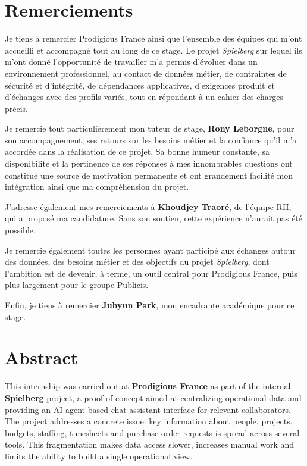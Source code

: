 \documentclass[a4paper,11pt,english,openany]{book}
\begin{document}
\newpage
{}

\chapter*{Remerciements}


Je tiens à remercier Prodigious France ainsi que l'ensemble des équipes qui m'ont accueilli et accompagné tout au long de ce stage. Le projet \textit{Spielberg} sur lequel ils m'ont donné l'opportunité de travailler m'a permis d'évoluer dans un environnement professionnel, au contact de données métier, de contraintes de sécurité et d'intégrité, de dépendances applicatives, d'exigences produit et d'échanges avec des profils variés, tout en répondant à un cahier des charges précis.

Je remercie tout particulièrement mon tuteur de stage, \textbf{Rony Leborgne}, pour son accompagnement, ses retours sur les besoins métier et la confiance qu'il m'a accordée dans la réalisation de ce projet. Sa bonne humeur constante, sa disponibilité et la pertinence de ses réponses à mes innombrables questions ont constitué une source de motivation permanente et ont grandement facilité mon intégration ainsi que ma compréhension du projet.

J'adresse également mes remerciements à \textbf{Khoudjey Traoré}, de l'équipe RH, qui a proposé ma candidature. Sans son soutien, cette expérience n'aurait pas été possible.

Je remercie également toutes les personnes ayant participé aux échanges autour des données, des besoins métier et des objectifs du projet \textit{Spielberg}, dont l'ambition est de devenir, à terme, un outil central pour Prodigious France, puis plus largement pour le groupe Publicis.

Enfin, je tiens à remercier \textbf{Juhyun Park}, mon encadrante académique pour ce stage.

\chapter*{Abstract}

This internship was carried out at \textbf{Prodigious France} as part of the internal \textbf{Spielberg} project, a proof of concept aimed at centralizing operational data and providing an AI-agent-based chat assistant interface for relevant collaborators. The project addresses a concrete issue: key information about people, projects, budgets, staffing, timesheets and purchase order requests is spread across several tools. This fragmentation makes data access slower, increases manual work and limits the ability to build a single operational view.
\end{document}
